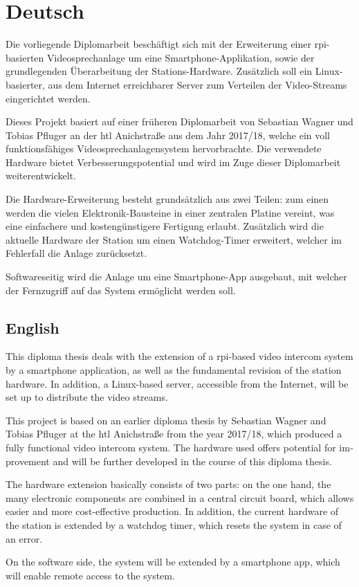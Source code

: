 \section{Deutsch}
Die vorliegende Diplomarbeit beschäftigt sich mit der Erweiterung einer \ac{rpi}-basierten Videosprechanlage um eine Smartphone-Applikation, sowie der grundlegenden Überarbeitung der Stations-Hardware.
Zusätzlich soll ein Linux-basierter, aus dem Internet erreichbarer Server zum Verteilen der Video-Streams eingerichtet werden.
\par
Dieses Projekt basiert auf einer früheren Diplomarbeit von Sebastian Wagner und Tobias Pfluger an der \ac{htl} Anichstraße aus dem Jahr 2017/18, welche ein voll funktionsfähiges Videosprechanlagensystem hervorbrachte.
Die verwendete Hardware bietet Verbesserungspotential und wird im Zuge dieser Diplomarbeit weiterentwickelt.
\par
Die Hardware-Erweiterung besteht grundsätzlich aus zwei Teilen: zum einen werden die vielen Elektronik-Bausteine in einer zentralen Platine vereint, was eine einfachere und kostengünstigere Fertigung erlaubt.
Zusätzlich wird die aktuelle Hardware der Station um einen Watchdog-Timer erweitert, welcher im Fehlerfall die Anlage zurücksetzt.
\par
Softwareseitig wird die Anlage um eine Smartphone-App ausgebaut, mit welcher der Fernzugriff auf das System ermöglicht werden soll.
\par
\newpage

\begin{otherlanguage}{british}
	\section{English}
	This diploma thesis deals with the extension of a \ac{rpi}-based video intercom system by a smartphone application, as well as the fundamental revision of the station hardware.
	In addition, a Linux-based server, accessible from the Internet, will be set up to distribute the video streams.
	\par
	This project is based on an earlier diploma thesis by Sebastian Wagner and Tobias Pfluger at the \ac{htl} Anichstraße from the year 2017/18, which produced a fully functional video intercom system.
	The hardware used offers potential for improvement and will be further developed in the course of this diploma thesis.
	\par
	The hardware extension basically consists of two parts: on the one hand, the many electronic components are combined in a central circuit board, which allows easier and more cost-effective production.
	In addition, the current hardware of the station is extended by a watchdog timer, which resets the system in case of an error.
	\par
	On the software side, the system will be extended by a smartphone app, which will enable remote access to the system.
	\par
\end{otherlanguage}